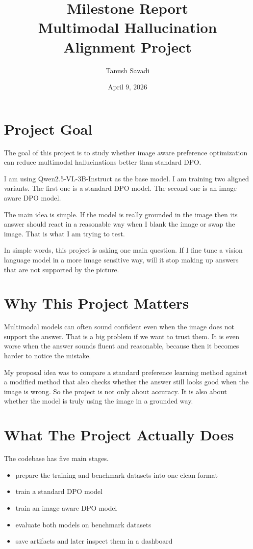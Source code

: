 \documentclass[11pt]{article}
\title{Milestone Report\\Multimodal Hallucination Alignment Project}
\author{Tanush Savadi}
\date{April 9, 2026}
\begin{document}
\maketitle

\section*{Project Goal}
The goal of this project is to study whether image aware preference optimization can reduce multimodal hallucinations better than standard DPO.

I am using Qwen2.5-VL-3B-Instruct as the base model.
I am training two aligned variants.
The first one is a standard DPO model.
The second one is an image aware DPO model.

The main idea is simple.
If the model is really grounded in the image then its answer should react in a reasonable way when I blank the image or swap the image.
That is what I am trying to test.

In simple words, this project is asking one main question.
If I fine tune a vision language model in a more image sensitive way, will it stop making up answers that are not supported by the picture.

\section*{Why This Project Matters}
Multimodal models can often sound confident even when the image does not support the answer.
That is a big problem if we want to trust them.
It is even worse when the answer sounds fluent and reasonable, because then it becomes harder to notice the mistake.

My proposal idea was to compare a standard preference learning method against a modified method that also checks whether the answer still looks good when the image is wrong.
So the project is not only about accuracy.
It is also about whether the model is truly using the image in a grounded way.

\section*{What The Project Actually Does}
The codebase has five main stages.

\begin{itemize}
    \item prepare the training and benchmark datasets into one clean format
    \item train a standard DPO model
    \item train an image aware DPO model
    \item evaluate both models on benchmark datasets
    \item save artifacts and later inspect them in a dashboard
\end{itemize}
\end{document}
